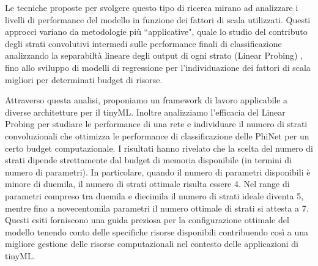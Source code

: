 


Le tecniche proposte per svolgere questo tipo di ricerca mirano ad analizzare i livelli di performance del modello in funzione dei fattori di scala utilizzati. Questi approcci variano da metodologie più ``applicative", quale lo studio del contributo degli strati convolutivi intermedi sulle performance finali di classificazione analizzando la separabiltà lineare degli output di ogni strato (Linear Probing) \cite{linearprobes}, fino allo sviluppo di modelli di regressione per l'individuazione dei fattori di scala migliori per determinati budget di risorse.

Attraverso questa analisi, proponiamo un framework di lavoro applicabile a diverse architetture per il tinyML. Inoltre analizziamo l'efficacia del Linear Probing per studiare le performance di una rete e individuare il numero di strati convoluzionali che ottimizza le performance di classificazione delle PhiNet per un certo budget computazionale.
I risultati hanno rivelato che la scelta del numero di strati dipende strettamente dal budget di memoria disponibile (in termini di numero di parametri). In particolare, quando il numero di parametri disponibili è minore di duemila, il numero di strati ottimale risulta essere 4. Nel range di parametri compreso tra duemila e diecimila il numero di strati ideale diventa 5, mentre fino a novecentomila parametri il numero ottimale di strati si attesta a 7. Questi esiti forniscono una guida preziosa per la configurazione ottimale del modello tenendo conto delle specifiche risorse disponibili contribuendo così a una migliore gestione delle risorse computazionali nel contesto delle applicazioni di tinyML.


